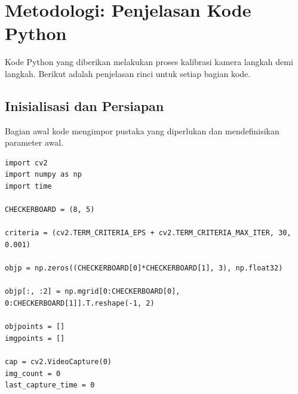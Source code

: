 \documentclass[12pt,a4paper]{article}
\begin{document}
\section{Metodologi: Penjelasan Kode Python}
Kode Python yang diberikan melakukan proses kalibrasi kamera langkah demi
langkah. Berikut adalah penjelasan rinci untuk setiap bagian kode.

\subsection{Inisialisasi dan Persiapan}
Bagian awal kode mengimpor pustaka yang diperlukan dan mendefinisikan parameter
awal.

\begin{lstlisting}[caption={Inisialisasi Pustaka dan Parameter}, label={lst:init}]
import cv2
import numpy as np
import time

CHECKERBOARD = (8, 5) 

criteria = (cv2.TERM_CRITERIA_EPS + cv2.TERM_CRITERIA_MAX_ITER, 30, 0.001)

objp = np.zeros((CHECKERBOARD[0]*CHECKERBOARD[1], 3), np.float32)

objp[:, :2] = np.mgrid[0:CHECKERBOARD[0], 0:CHECKERBOARD[1]].T.reshape(-1, 2)

objpoints = [] 
imgpoints = [] 

cap = cv2.VideoCapture(0)
img_count = 0 
last_capture_time = 0  
\end{lstlisting}
\end{document}
